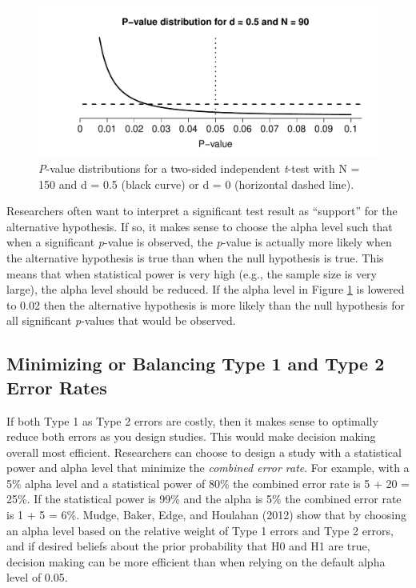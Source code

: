 \documentclass[,jou,floatsintext]{apa6}
\begin{document}
\begin{figure}
\centering
\includegraphics{Justify_in_Practice_files/figure-latex/p-plot-1.pdf}
\caption{\label{fig:p-plot}\emph{P}-value distributions for a two-sided independent \emph{t}-test with N = 150 and d = 0.5 (black curve) or d = 0 (horizontal dashed line).}
\end{figure}

Researchers often want to interpret a significant test result as \enquote{support} for the alternative hypothesis. If so, it makes sense to choose the alpha level such that when a significant \emph{p}-value is observed, the \emph{p}-value is actually more likely when the alternative hypothesis is true than when the null hypothesis is true. This means that when statistical power is very high (e.g., the sample size is very large), the alpha level should be reduced. If the alpha level in Figure \ref{fig:p-plot} is lowered to 0.02 then the alternative hypothesis is more likely than the null hypothesis for all significant \emph{p}-values that would be observed.

\hypertarget{minimizing-or-balancing-type-1-and-type-2-error-rates}{%
\subsection{Minimizing or Balancing Type 1 and Type 2 Error Rates}\label{minimizing-or-balancing-type-1-and-type-2-error-rates}}

If both Type 1 as Type 2 errors are costly, then it makes sense to optimally reduce both errors as you design studies. This would make decision making overall most efficient. Researchers can choose to design a study with a statistical power and alpha level that minimize the \emph{combined error rate}. For example, with a 5\% alpha level and a statistical power of 80\% the combined error rate is 5 + 20 = 25\%. If the statistical power is 99\% and the alpha is 5\% the combined error rate is 1 + 5 = 6\%. Mudge, Baker, Edge, and Houlahan (2012) show that by choosing an alpha level based on the relative weight of Type 1 errors and Type 2 errors, and if desired beliefs about the prior probability that H0 and H1 are true, decision making can be more efficient than when relying on the default alpha level of 0.05.
\end{document}
